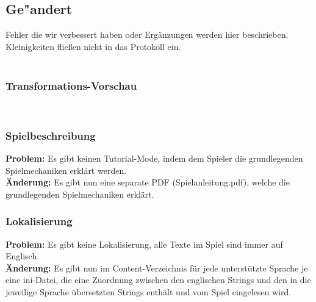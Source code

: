 %



\subsection{Ge{"a}ndert}
\label{Abschnitt:Aenderungen:Protokoll:Behobene_Probleme}

Fehler die wir verbessert haben oder Ergänzungen werden hier beschrieben. Kleinigkeiten fließen nicht in das Protokoll ein.\\~\\











\subsubsection*{Transformations-Vorschau}
~\\






\subsubsection*{Spielbeschreibung}

\textbf{Problem:}
Es gibt keinen Tutorial-Mode, indem dem Spieler die grundlegenden Spielmechaniken erklärt werden.\\

\textbf{Änderung:} Es gibt nun eine separate PDF (\glqq Spielanleitung.pdf\grqq), welche die grundlegenden Spielmechaniken erklärt.\\



\subsubsection*{Lokalisierung}

\textbf{Problem:}
Es gibt keine Lokalisierung, alle Texte im Spiel sind immer auf Englisch.\\

\textbf{Änderung:} Es gibt nun im Content-Verzeichnis für jede unterstützte Sprache je eine ini-Datei, die eine Zuordnung zwischen den englischen Strings und den in die jeweilige Sprache übersetzten Strings enthält und vom Spiel eingelesen wird.\\


